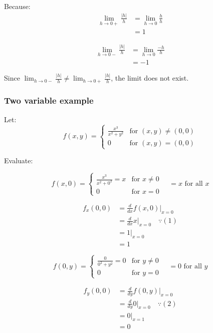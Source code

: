 \documentclass[11pt]{article}
\begin{document}
Because:
\begin{align*}
\lim_{h \rightarrow 0+} \frac{|h|}{h} &= \lim_{h \rightarrow 0} \frac{h}{h} \\
&= 1
\end{align*}

\begin{align*}
\lim_{h \rightarrow 0-} \frac{|h|}{h} &= \lim_{h \rightarrow 0} \frac{-h}{h} \\
&= -1
\end{align*}

Since \(\lim_{h \rightarrow 0-} \frac{|h|}{h} \ne \lim_{h \rightarrow 0+} \frac{|h|}{h}\), the limit does not exist.

\newpage
\subsubsection{Two variable example}
\label{sec:org644fc77}
Let:
\[
f(x, y) = \begin{cases}
\frac{x^3}{x^2 + y^2} & \text{for } (x, y) \ne (0, 0) \\
0 & \text{for } (x, y) = (0, 0)
\end{cases}
\]


Evaluate:

\[
f(x, 0) = \begin{cases}
\frac{x^3}{x^2 + 0^2} = x & \text{for } x \ne 0 \\
0 & \text{for } x = 0
\end{cases}
\quad = x \text{ for all } x \tag{1}
\]

\begin{align*}
f_x(0, 0) &= \frac{d}{dx} f(x, 0)|_{x = 0} \\
&= \frac{d}{dx}x|_{x = 0} \quad \because (1) \\
&= 1|_{x = 0} \\
&= 1
\end{align*}

\[
f(0, y) = \begin{cases}
\frac{0}{0^2 + y^2} = 0 & \text{for } y \ne 0 \\
0 & \text{for } y = 0
\end{cases}
\quad = 0 \text{ for all } y \tag{2}
\]

\begin{align*}
f_y(0, 0) &= \frac{d}{dy} f(0, y)|_{x = 0} \\
&= \frac{d}{dy}0|_{x = 0} \quad \because (2) \\
&= 0|_{x = 1} \\
&= 0
\end{align*}
\end{document}
